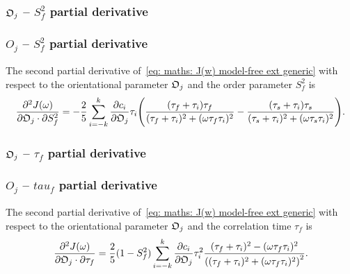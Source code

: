 \begin{latexonly}
    \subsubsection{$\mathfrak{O}_j$ -- $S^2_f$ partial derivative}
\end{latexonly}
\begin{htmlonly}
    \subsubsection{$O_j$ -- $S^2_f$ partial derivative}
\end{htmlonly}

The second partial derivative of~\eqref{eq: maths: J(w) model-free ext generic} with respect to the orientational parameter $\mathfrak{O}_j$ and the order parameter $S^2_f$ is
\begin{equation}
    \frac{\partial^2 J(\omega)}{\partial \mathfrak{O}_j \cdot \partial S^2_f} = -\frac{2}{5} \sum_{i=-k}^k \frac{\partial c_i}{\partial \mathfrak{O}_j} \tau_i \Bigg(
        \frac{(\tau_f + \tau_i)\tau_f}{(\tau_f + \tau_i)^2 + (\omega \tau_f \tau_i)^2}
        - \frac{(\tau_s + \tau_i)\tau_s}{(\tau_s + \tau_i)^2 + (\omega \tau_s \tau_i)^2}
    \Bigg).
\end{equation}



\begin{latexonly}
    \subsubsection{$\mathfrak{O}_j$ -- $\tau_f$ partial derivative}
\end{latexonly}
\begin{htmlonly}
    \subsubsection{$O_j$ -- $tau_f$ partial derivative}
\end{htmlonly}

The second partial derivative of~\eqref{eq: maths: J(w) model-free ext generic} with respect to the orientational parameter $\mathfrak{O}_j$ and the correlation time $\tau_f$ is
\begin{equation}
    \frac{\partial^2 J(\omega)}{\partial \mathfrak{O}_j \cdot \partial \tau_f} = \frac{2}{5} (1 - S^2_f) \sum_{i=-k}^k
        \frac{\partial c_i}{\partial \mathfrak{O}_j} \tau_i^2
        \frac{(\tau_f + \tau_i)^2 - (\omega \tau_f \tau_i)^2}{\left((\tau_f + \tau_i)^2 + (\omega \tau_f \tau_i)^2 \right)^2}.
\end{equation}



